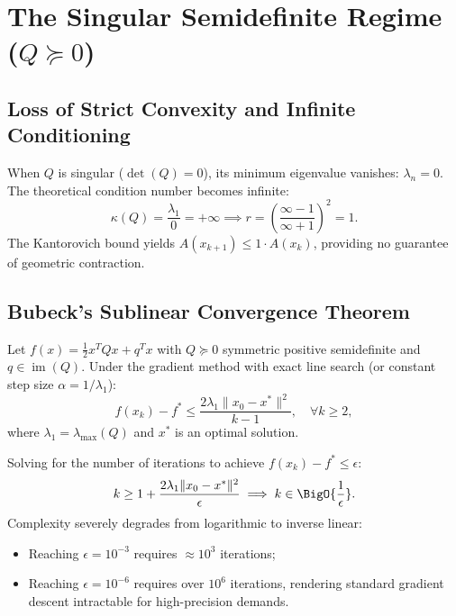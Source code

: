 \FloatBarrier
\section[The Singular Semidefinite Regime (Q >= 0)]{The Singular Semidefinite Regime ($Q \succeq 0$)}
\label{sec:singular-semidefinite-regime}

\subsection{Loss of Strict Convexity and Infinite Conditioning}
When $Q$ is singular ($\det(Q) = 0$), its minimum eigenvalue vanishes: $\lambda_n = 0$. The theoretical condition number becomes infinite:
\begin{equation}
    \kappa(Q) = \frac{\lambda_1}{0} = +\infty \implies r = \left( \frac{\infty - 1}{\infty + 1} \right)^2 = 1.
\end{equation}
The Kantorovich bound yields $A(x_{k+1}) \le 1 \cdot A(x_k)$, providing no guarantee of geometric contraction.

\subsection{Bubeck's Sublinear Convergence Theorem}

\begin{theorem}
\label{thm:bubeck-sublinear-en}
Let $f(x) = \frac{1}{2} x^T Q x + q^T x$ with $Q \succeq 0$ symmetric positive semidefinite and $q \in \operatorname{im}(Q)$. Under the gradient method with exact line search (or constant step size $\alpha = 1/\lambda_1$):
\begin{equation}
    f(x_k) - f^* \le \frac{2 \lambda_1 \|x_0 - x^*\|^2}{k - 1}, \quad \forall k \ge 2,
    \label{eq:bubeck-bound-en}
\end{equation}
where $\lambda_1 = \lambda_{\max}(Q)$ and $x^*$ is an optimal solution.
\end{theorem}

Solving for the number of iterations to achieve $f(x_k) - f^* \le \epsilon$:
\begin{equation}
    k \ge 1 + \frac{2 \lambda_1 \|x_0 - x^*\|^2}{\epsilon} \implies k \in \BigO{\frac{1}{\epsilon}}.
\end{equation}
Complexity severely degrades from logarithmic to inverse linear:
\begin{itemize}
    \item Reaching $\epsilon = 10^{-3}$ requires $\approx 10^3$ iterations;
    \item Reaching $\epsilon = 10^{-6}$ requires over $10^6$ iterations, rendering standard gradient descent intractable for high-precision demands.
\end{itemize}

